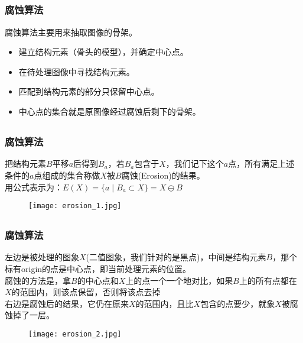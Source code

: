 \documentclass[notheorems,mathserif,table,compress]{beamer}  %
\begin{document}
\subsection{}
\begin{frame}
   \frametitle{腐蚀算法}
    \hspace{0.2in}腐蚀算法主要用来抽取图像的骨架。
   \begin{itemize}
   \item 建立结构元素（骨头的模型），并确定中心点。
   \item 在待处理图像中寻找结构元素。
   \item 匹配到结构元素的部分只保留中心点。
   \item 中心点的集合就是原图像经过腐蚀后剩下的骨架。
   \end{itemize}
\end{frame}

\subsection{}
\begin{frame}
   \frametitle{腐蚀算法}
   \hspace{0.3in}把结构元素$B$平移$a$后得到$B_{a}$，若$B_{a}$包含于$X$，我们记下这个$a$点，所有满足上述条件的$a$点组成的集合称做$X$被$B$腐蚀(Erosion)的结果。\\
   用公式表示为：$E(X)=\{a\mid B_{a}\subset X \}=X\ominus B$
   \begin{figure}
   \centering
   \texttt{[image: erosion\_1.jpg]}
   \end{figure}
\end{frame}

\subsection{}
\begin{frame}
   \frametitle{腐蚀算法}
   \hspace{0.3in}左边是被处理的图象$X$(二值图象，我们针对的是黑点)，中间是结构元素$B$，那个标有origin的点是中心点，即当前处理元素的位置。\\
   \hspace{0.3in}腐蚀的方法是，拿$B$的中心点和$X$上的点一个一个地对比，如果$B$上的所有点都在$X$的范围内，则该点保留，否则将该点去掉\\
   \hspace{0.3in}右边是腐蚀后的结果，它仍在原来$X$的范围内，且比$X$包含的点要少，就象$X$被腐蚀掉了一层。
   \begin{figure}
   \centering
   \texttt{[image: erosion\_2.jpg]}
   \end{figure}
\end{frame}
\end{document}
